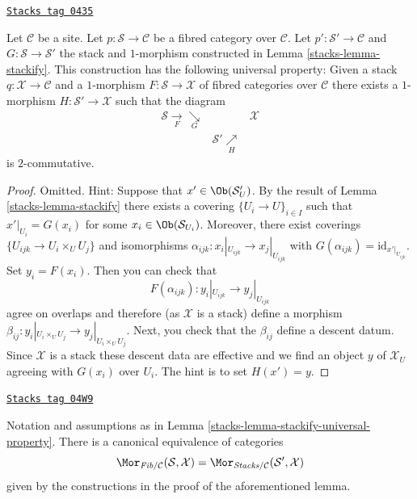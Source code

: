 \begin{lemma}
\label{stacks-lemma-stackify-universal-property}
\href{https://stacks.math.columbia.edu/tag/0435}{\texttt{Stacks tag 0435}}

Let $\mathcal{C}$ be a site.
Let $p : \mathcal{S} \to \mathcal{C}$ be a fibred category over $\mathcal{C}$.
Let $p' : \mathcal{S}' \to \mathcal{C}$ and $G : \mathcal{S} \to \mathcal{S}'$
the stack and $1$-morphism constructed in Lemma \ref{stacks-lemma-stackify}.
This construction has the following universal property: Given a stack
$q : \mathcal{X} \to \mathcal{C}$ and a $1$-morphism
$F : \mathcal{S} \to \mathcal{X}$ of fibred categories over $\mathcal{C}$
there exists a $1$-morphism $H : \mathcal{S}' \to \mathcal{X}$
such that the diagram
$$
\begin{array}{ccc}\mathcal{S} \underset{F}{\longrightarrow}\underset{G}{\searrow} &  & \mathcal{X} \\  & \mathcal{S}' \underset{H}{\nearrow} & \end{array}
$$
is $2$-commutative.
\end{lemma}

\begin{proof}

Omitted. Hint: Suppose that $x' \in \Ob(\mathcal{S}'_U)$.
By the result of Lemma \ref{stacks-lemma-stackify}
there exists a covering $\{U_i \to U\}_{i \in I}$
such that $x'|_{U_i} = G(x_i)$ for some $x_i \in \Ob(\mathcal{S}_{U_i})$.
Moreover, there exist coverings $\{U_{ijk} \to U_i \times_U U_j\}$
and isomorphisms $\alpha_{ijk} : x_i|_{U_{ijk}} \to x_j|_{U_{ijk}}$
with $G(\alpha_{ijk}) = \text{id}_{x'|_{U_{ijk}}}$. Set $y_i = F(x_i)$.
Then you can check that
$$
F(\alpha_{ijk}) : y_i|_{U_{ijk}} \to y_j|_{U_{ijk}}
$$
agree on overlaps and therefore (as $\mathcal{X}$ is a stack) define
a morphism $\beta_{ij} : y_i|_{U_i \times_U U_j} \to y_j|_{U_i \times_U U_j}$.
Next, you check that the $\beta_{ij}$ define a descent datum. Since
$\mathcal{X}$ is a stack these descent data are effective and we find
an object $y$ of $\mathcal{X}_U$ agreeing with $G(x_i)$ over $U_i$.
The hint is to set $H(x') = y$.
\end{proof}

\begin{lemma}
\label{stacks-lemma-stackify-universal-property-more}
\href{https://stacks.math.columbia.edu/tag/04W9}{\texttt{Stacks tag 04W9}}

Notation and assumptions as in
Lemma \ref{stacks-lemma-stackify-universal-property}.
There is a canonical equivalence of categories
$$
\Mor_{\textit{Fib}/\mathcal{C}}(\mathcal{S}, \mathcal{X})
=
\Mor_{\textit{Stacks}/\mathcal{C}}(\mathcal{S}', \mathcal{X})
$$
given by the constructions in the proof of the aforementioned lemma.
\end{lemma}

